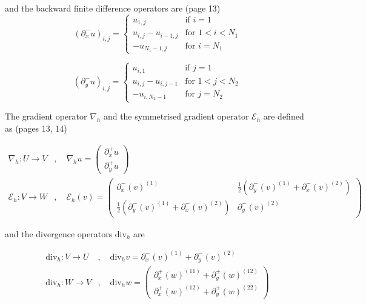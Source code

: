 \documentclass{article}
\begin{document}
and the backward finite difference operators are (page 13)
\begin{equation}
    (\partial_x^- u)_{i,j} = 
    \begin{cases}
    u_{1,j} & \text{if } i = 1 \\
    u_{i,j} - u_{i-1,j} & \text{for } 1 < i < N_1 \\
    -u_{N_1-1,j} & \text{for } i = N_1
    \end{cases}
\end{equation}
    
\begin{equation}
    (\partial_y^- u)_{i,j} = 
    \begin{cases}
    u_{i,1} & \text{if } j = 1 \\
    u_{i,j} - u_{i,j-1} & \text{for } 1 < j < N_2 \\
    -u_{i,N_2-1} & \text{for } j = N_2
    \end{cases}
\end{equation}






The gradient operator $\nabla_h$ and the symmetrised gradient operator $\mathcal{E}_h$ are defined as (pages 13, 14)

\begin{equation}
    \begin{aligned}
    \nabla_h : U \rightarrow V &, \quad \nabla_h u = 
    \begin{pmatrix}
    \partial_x^+ u \\
    \partial_y^+ u
    \end{pmatrix} \\
    \mathcal{E}_h : V \rightarrow W &, \quad \mathcal{E}_h (v) = 
    \begin{pmatrix}
    \partial_x^- (v)^{(1)} &
    \frac{1}{2} \left( \partial_y^- (v)^{(1)} + \partial_x^- (v)^{(2)} \right) \\
    \frac{1}{2} \left( \partial_y^- (v)^{(1)} + \partial_x^- (v)^{(2)} \right) &
    \partial_y^- (v)^{(2)}
    \end{pmatrix}
    \end{aligned}
\end{equation}

and the divergence operators $\mathrm{div}_h$ are


\begin{equation}
\begin{aligned}
\mathrm{div}_h : V \rightarrow U &, \quad \mathrm{div}_h v = \partial_x^- (v)^{(1)} + \partial_y^- (v)^{(2)} \\
\mathrm{div}_h : W \rightarrow V &, \quad \mathrm{div}_h w = 
\begin{pmatrix}
\partial_x^+ (w)^{(11)} + \partial_y^+ (w)^{(12)} \\
\partial_x^+ (w)^{(12)} + \partial_y^+ (w)^{(22)}
\end{pmatrix}
\end{aligned}
\end{equation}
\end{document}
